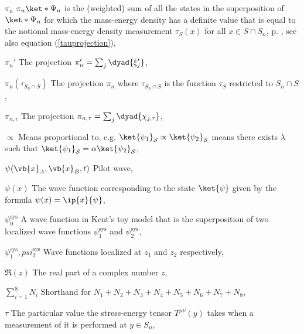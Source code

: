 \begin{thenomenclature}
  \item [{$\pi_n$}]\begingroup $\pi_n \ket*{\Psi_n}$ is the (weighted) sum of all the states in the superposition of $\ket*{\Psi_n}$ for which the mass-energy density has a definite value that is equal to the notional mass-energy density measurement $\tau_S(x)$ for all $x\in S\cap S_n$, p. \pageref{overviewpi}, see also equation (\ref{tauprojection}), \nomrefpage{}
  \item [{$\pi_n'$}]\begingroup The projection $\pi_n'=\sum_j\dyad{\xi_j'}$, \nomrefpage{}
  \item [{$\pi_n(\tau_{S_n\cap S})$}]\begingroup The projection $\pi_n$ where $\tau_{S_n\cap S}$ is the function $\tau_S$ restricted to $S_n\cap S$, \nomrefpage{}
  \item [{$\pi_{n,\tau}$}]\begingroup The projection $\pi_{n,\tau}=\sum_j\dyad{\chi_{j,\tau}}$, \nomrefpage{}
  \item [{$\propto $}]\begingroup Means proportional to, e.g. $\ket {\psi _1}_\mathcal {S}\propto \ket {\psi _2}_\mathcal {S}$ means there exists $\lambda $ such that $\ket {\psi _1}_\mathcal {S}=\alpha \ket {\psi _2}_\mathcal {S}$, \nomrefpage {}
  \item [{$\psi(\vb{x}_A, \vb{x}_B, t)$}]\begingroup Pilot wave, \nomrefpage{}
  \item [{$\psi(x)$}]\begingroup The wave function corresponding to the state $\ket{\psi}$ given by the formula $\psi(x)=\ip{x}{\psi}$,  \nomrefpage{}
  \item [{$\psi_0^\text{sys}$}]\begingroup A wave function in Kent's toy model that is the superposition of two localized wave functions $\psi_1^\text{sys}$ and $\psi_2^\text{sys}$, \nomrefpage{}
  \item [{$\psi_1^\text{sys}, psi_2^\text{sys}$}]\begingroup Wave functions localized at $z_1$ and $z_2$ respectively, \nomrefpage{}
  \item [{$\Re(z)$}]\begingroup The real part of a complex number $z$,  \nomrefpage{}
  \item [{$\sum _{i=1}^8 N_i$}]\begingroup Shorthand for $N_1+N_2+N_3+N_4+N_5+N_6+N_7+N_8$, \nomrefpage {}
  \item [{$\tau$}]\begingroup The particular value the stress-energy tensor $T^{\mu\nu}(y)$ takes when a measurement of it is performed at $y\in S_n$, \nomrefpage{}

\end{thenomenclature}
